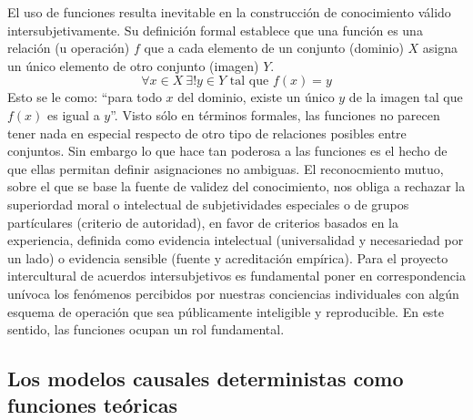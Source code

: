 \documentclass[a4paper,10pt]{book}
\begin{document}
El uso de funciones resulta inevitable en la construcción de conocimiento válido intersubjetivamente.
%
Su definición formal establece que una función es una relación (u operación) $f$ que a cada elemento de un conjunto (dominio) $X$ asigna un único elemento de otro conjunto (imagen) $Y$.
%
\begin{equation}
 \forall x \in X \  \exists! y \in Y \text{ tal que } f(x) = y    
\end{equation}
%
Esto se le como: ``para todo $x$ del dominio, existe un único $y$ de la imagen tal que $f(x)$ es igual a $y$''.
%
Visto sólo en términos formales, las funciones no parecen tener nada en especial respecto de otro tipo de relaciones posibles entre conjuntos.
%
Sin embargo lo que hace tan poderosa a las funciones es el hecho de que ellas permitan definir asignaciones no ambiguas.
%
El reconocmiento mutuo, sobre el que se base la fuente de validez del conocimiento, nos obliga a rechazar la superiordad moral o intelectual de subjetividades especiales o de grupos partículares (criterio de autoridad), en favor de criterios basados en la experiencia, definida como evidencia intelectual (universalidad y necesariedad por un lado) o evidencia sensible (fuente y acreditación empírica).
%
Para el proyecto intercultural de acuerdos intersubjetivos es fundamental poner en correspondencia unívoca los fenómenos percibidos por nuestras conciencias individuales con algún esquema de operación que sea públicamente inteligible y reproducible.
%
En este sentido, las funciones ocupan un rol fundamental.

\subsection{Los modelos causales deterministas como funciones teóricas}
\end{document}
